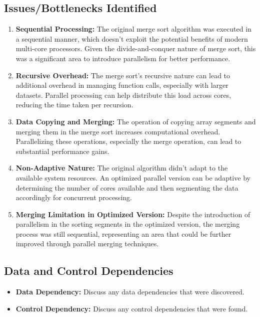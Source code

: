 \documentclass[12pt]{article}
\begin{document}
    \subsection{Issues/Bottlenecks Identified}
    \begin{enumerate}
        \item \textbf{Sequential Processing:} The original merge sort algorithm was executed in a sequential manner, which doesn't exploit the potential benefits of modern multi-core processors. Given the divide-and-conquer nature of merge sort, this was a significant area to introduce parallelism for better performance.

        \item \textbf{Recursive Overhead:} The merge sort's recursive nature can lead to additional overhead in managing function calls, especially with larger datasets. Parallel processing can help distribute this load across cores, reducing the time taken per recursion.

        \item \textbf{Data Copying and Merging:} The operation of copying array segments and merging them in the merge sort increases computational overhead. Parallelizing these operations, especially the merge operation, can lead to substantial performance gains.

        \item \textbf{Non-Adaptive Nature:} The original algorithm didn't adapt to the available system resources. An optimized parallel version can be adaptive by determining the number of cores available and then segmenting the data accordingly for concurrent processing.

        \item \textbf{Merging Limitation in Optimized Version:} Despite the introduction of parallelism in the sorting segments in the optimized version, the merging process was still sequential, representing an area that could be further improved through parallel merging techniques.

    \end{enumerate}


    \subsection{Data and Control Dependencies}
    \begin{itemize}
        \item \textbf{Data Dependency:} Discuss any data dependencies that were discovered.
        \item \textbf{Control Dependency:} Discuss any control dependencies that were found.
    \end{itemize}
\end{document}
